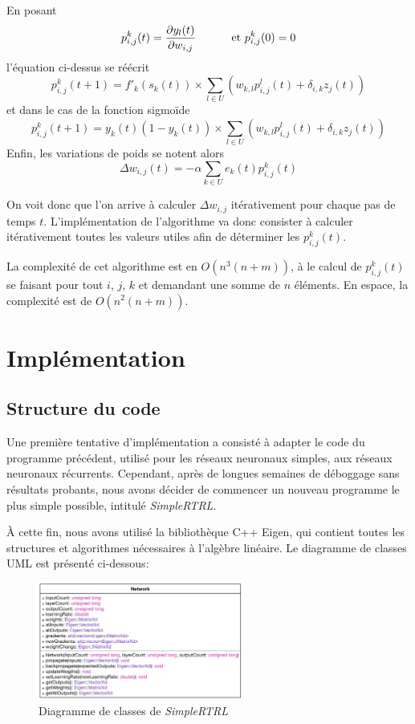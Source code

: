 En posant
\[ p_{i,j}^k(t) = \frac{\partial y_l(t)}{\partial w_{i,j}} \hspace*{1cm} \text{ et }p_{i,j}^k(0) = 0 \]
l'équation ci-dessus se réécrit
\[ p_{i,j}^k(t+1) = f'_k(s_k(t)) \times \sum_{l \in U} \left( w_{k,l} p_{i,j}^l(t) + \delta_{i,k} z_j(t) \right) \]
et dans le cas de la fonction sigmoïde
\[ p_{i,j}^k(t+1) = y_k(t) (1 - y_k(t)) \times \sum_{l \in U} \left( w_{k,l} p_{i,j}^l(t) + \delta_{i,k} z_j(t) \right) \]
Enfin, les variations de poids se notent alors
\[ \Delta w_{i,j}(t) = -\alpha \sum_{k \in U} e_k(t) p_{i,j}^k(t) \]

On voit donc que l'on arrive à calculer $\Delta w_{i,j}$ itérativement pour chaque pas de temps $t$. L'implémentation de l'algorithme va donc consister à calculer itérativement toutes les valeurs utiles afin de déterminer les $p_{i,j}^k(t)$.

La complexité de cet algorithme est en $O(n^3(n+m))$, à le calcul de $p_{i,j}^k(t)$ se faisant pour tout $i$, $j$, $k$ et demandant une somme de $n$ éléments. En espace, la complexité est de $O(n^2(n+m))$.

\section{Implémentation}
\subsection{Structure du code}

Une première tentative d'implémentation a consisté à adapter le code du programme précédent, utilisé pour les réseaux neuronaux simples, aux réseaux neuronaux récurrents. Cependant, après de longues semaines de déboggage sans résultats probants, nous avons décider de commencer un nouveau programme le plus simple possible, intitulé \textit{SimpleRTRL}.

À cette fin, nous avons utilisé la bibliothèque C++ Eigen, qui contient toutes les structures et algorithmes nécessaires à l'algèbre linéaire. Le diagramme de classes UML est présenté ci-dessous:

\begin{figure}[!ht]
\begin{center}
\includegraphics[width=0.6\textwidth]{images/SimpleRTRL-UML.png}
\end{center}
\caption{Diagramme de classes de \textit{SimpleRTRL}}
\end{figure}

